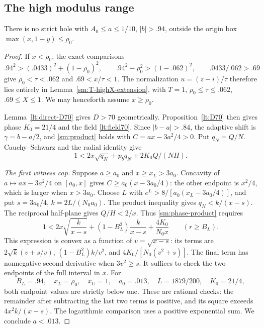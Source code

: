 \subsection{The high modulus range}

\begin{proposition}\label{sm:high}
There is no strict hole with $A_0\le a\le1/10$, $|b|>.94$,
outside the origin box $\max(x,1-y)\le\rho_0$.
\end{proposition}
\begin{proof}
If $x<\rho_0$, the exact comparisons
\[
 .94^2>(.0433)^2+(1-\rho_0)^2,\qquad
 .94^2-\rho_0^2>(1-.062)^2,\qquad .0433/.062>.69
\]
give $\rho_0<\tau<.062$ and $.69<x/\tau<1$.
The normalization $u=(z-i)/\tau$ therefore lies entirely in
Lemma~\ref{sm:T-highX-extension}, with $T=1$,
$\rho_0\le\tau\le.062$, $.69\le X\le1$.
We may henceforth assume $x\ge\rho_0$.

Lemma~\ref{lt:direct-D70} gives $D>70$ geometrically.
Proposition~\ref{lt:D70} then gives phase $K_0=21/4$ and the
field \eqref{lt:field70}. Since $|b-a|>.84$, the adaptive shift
is $\gamma=b-a/2$, and \eqref{sm:product} holds with
$C=ax-3a^2/4>0$.
Put $q_N=Q/N$. Cauchy--Schwarz and the radial identity give
\begin{equation}\label{sm:phase-product}
 1<2x\sqrt{q_N}+p_bq_N+2K_0Q/(NH).
\end{equation}

\smallskip\noindent\emph{The first witness cap.}
Suppose $a\ge a_0$ and $x\ge x_L>3a_0$. Concavity of
$a\mapsto ax-3a^2/4$ on $[a_0,x]$ gives
$C\ge a_0(x-3a_0/4)$: the other endpoint is $x^2/4$, which
is larger when $x>3a_0$.
Choose $L$ with $e^L>8/[a_0(x_L-3a_0/4)]$, and put
$s=3a_0/4$, $k=2L/(N_0a_0)$.
The product inequality gives $q_N<k/(x-s)$.
The reciprocal half-plane gives $Q/H<2/x$.
Thus \eqref{sm:phase-product} requires
\begin{equation}\label{sm:initial-cap-function}
 1<2x\sqrt{\frac{k}{x-s}}+
       (1-B_L^2)\frac{k}{x-s}+\frac{4K_0}{N_0x}
       \qquad(r\ge B_L).
\end{equation}
This expression is convex as a function of $v=\sqrt{x-s}$:
its terms are $2\sqrt k(v+s/v)$,
$(1-B_L^2)k/v^2$, and $4K_0/[N_0(v^2+s)]$.
The final term has nonnegative second derivative when $3v^2\ge s$.
It suffices to check the two endpoints of the full interval in $x$.
For
\[
 B_L=.94,\quad x_L=\rho_0,\quad x_U=1,\quad
 a_0=.013,\quad L=1879/200,\quad K_0=21/4,
\]
both endpoint values are strictly below one. These are rational
checks: the remainder after subtracting the last two terms is
positive, and its square exceeds $4x^2k/(x-s)$.
The logarithmic comparison uses a positive exponential sum.
We conclude $a<.013$.


\end{proof}
